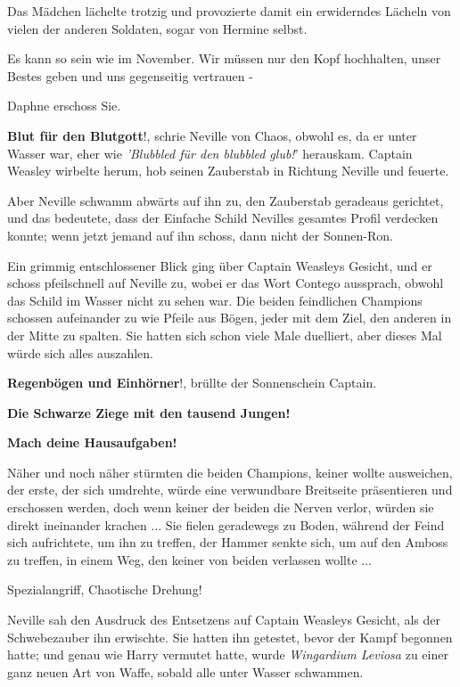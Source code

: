 Das Mädchen lächelte trotzig und provozierte damit ein erwiderndes Lächeln von
vielen der anderen Soldaten, sogar von Hermine selbst.

\glqq{}Es kann so sein wie im November. Wir müssen nur den Kopf hochhalten, unser
Bestes geben und uns gegenseitig vertrauen -\grqq{}

Daphne erschoss Sie.

\glqq{}\textbf{Blut für den Blutgott}!\grqq{}, schrie Neville von Chaos, obwohl
es, da er unter Wasser war, eher wie \emph{'Blubbled für den blubbled glub!}'
herauskam. Captain Weasley wirbelte herum, hob seinen Zauberstab in Richtung
Neville und feuerte.

Aber Neville schwamm abwärts auf ihn zu, den Zauberstab geradeaus gerichtet, und
das bedeutete, dass der Einfache Schild Nevilles gesamtes Profil verdecken
konnte; wenn jetzt jemand auf ihn schoss, dann nicht der Sonnen-Ron.

Ein grimmig entschlossener Blick ging über Captain Weasleys Gesicht, und er
schoss pfeilschnell auf Neville zu, wobei er das Wort Contego aussprach, obwohl
das Schild im Wasser nicht zu sehen war. Die beiden feindlichen Champions
schossen aufeinander zu wie Pfeile aus Bögen, jeder mit dem Ziel, den anderen in
der Mitte zu spalten. Sie hatten sich schon viele Male duelliert, aber dieses
Mal würde sich alles auszahlen.

\glqq{}\textbf{Regenbögen und Einhörner}!\grqq{}, brüllte der Sonnenschein
Captain.

\glqq{}\textbf{Die Schwarze Ziege mit den tausend Jungen!}\grqq{}

\glqq{}\textbf{Mach deine Hausaufgaben!}\grqq{}

Näher und noch näher stürmten die beiden Champions, keiner wollte ausweichen,
der erste, der sich umdrehte, würde eine verwundbare Breitseite präsentieren und
erschossen werden, doch wenn keiner der beiden die Nerven verlor, würden sie
direkt ineinander krachen ... Sie fielen geradewegs zu Boden, während der Feind
sich aufrichtete, um ihn zu treffen, der Hammer senkte sich, um auf den Amboss
zu treffen, in einem Weg, den keiner von beiden verlassen wollte ...

\glqq{}Spezialangriff, Chaotische Drehung!\grqq{}

Neville sah den Ausdruck des Entsetzens auf Captain Weasleys Gesicht, als der
Schwebezauber ihn erwischte. Sie hatten ihn getestet, bevor der Kampf begonnen
hatte; und genau wie Harry vermutet hatte, wurde \emph{Wingardium Leviosa} zu
einer ganz neuen Art von Waffe, sobald alle unter Wasser schwammen.


